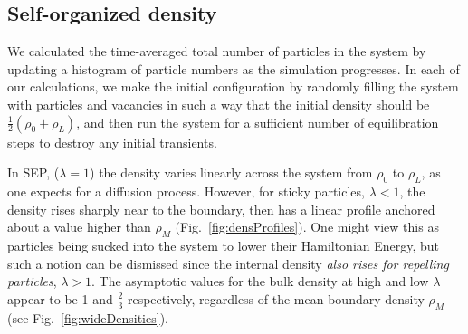 \documentclass[
reprint, amsmath,amssymb,
]{revtex4-1}
\begin{document}
\subsection{Self-organized density}


We calculated the time-averaged total number of particles in
the system by updating a histogram of particle numbers
as the simulation progresses. In each of our calculations, we make the
initial configuration by randomly filling the system with particles
and vacancies in such a way that the initial density should be
$\frac{1}{2}(\rho_0 + \rho_L)$, and then run the system for a
sufficient number of equilibration steps to destroy any initial
transients.

In SEP, ($\lambda=1$) the density varies linearly across the system
from $\rho_0$ to $\rho_L$, as one expects for a diffusion process.
However, for sticky particles, $\lambda<1$, the density rises sharply
near to the boundary, then has a linear profile anchored about a value higher
than $\rho_M$  (Fig.~\ref{fig:densProfiles}). 
One might view this as particles being sucked into the
system to lower their Hamiltonian Energy, but such a notion can be
dismissed since the internal density {\it also rises for repelling
  particles}, $\lambda>1$.  The asymptotic values for the bulk density at
high and low $\lambda$ appear to be 1 and $\frac{2}{3}$ respectively, regardless of the 
mean boundary density $\rho_M$ (see Fig.~\ref{fig:wideDensities}). 
\end{document}
